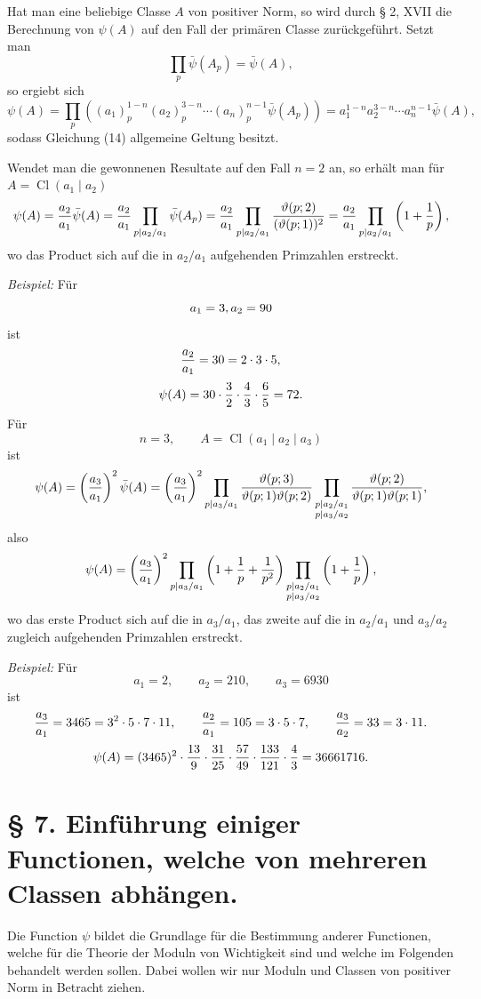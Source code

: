 \documentclass[11pt,a4paper]{article}
\newcommand{\Cl}{\operatorname{Cl}}
\newcommand{\tht}{\vartheta}
\begin{document}
Hat man eine beliebige Classe $A$ von positiver Norm, so wird durch § 2, XVII die Berechnung von $\psi(A)$ auf den Fall der primären Classe zurückgeführt. Setzt man
\[
 \prod_p\bar\psi(A_p)=\bar\psi(A),
\]
so ergiebt sich
\[
 \psi(A)=\prod_p\left((a_1)_p^{1-n}(a_2)_p^{3-n}\cdots(a_n)_p^{n-1}\bar\psi(A_p)\right)
 =a_1^{1-n}a_2^{3-n}\cdots a_n^{n-1}\bar\psi(A),
\]
sodass Gleichung (14) allgemeine Geltung besitzt.

Wendet man die gewonnenen Resultate auf den Fall $n=2$ an, so erhält man für $A=\Cl(a_1\mid a_2)$
\[
 \psi(A)={a_2\over a_1}\bar\psi(A)
 ={a_2\over a_1}\prod_{p\mid a_2/a_1}\bar\psi(A_p)
 ={a_2\over a_1}\prod_{p\mid a_2/a_1}{\tht(p;2)\over(\tht(p;1))^2}
 ={a_2\over a_1}\prod_{p\mid a_2/a_1}\left(1+{1\over p}\right),
\]
wo das Product sich auf die in $a_2/a_1$ aufgehenden Primzahlen erstreckt.

\emph{Beispiel:} Für
\[
 a_1=3,\\ a_2=90
\]
ist
\[
 {a_2\over a_1}=30=2\cdot3\cdot5,
\]
\[
 \psi(A)=30\cdot {3\over2}\cdot {4\over3}\cdot {6\over5}=72.
\]
Für
\[
 n=3,
 \qquad A=\Cl(a_1\mid a_2\mid a_3)
\]
ist
\[
 \psi(A)=\left({a_3\over a_1}\right)^2\bar\psi(A)
 =\left({a_3\over a_1}\right)^2
 \prod_{p\mid a_3/a_1}{\tht(p;3)\over\tht(p;1)\tht(p;2)}
 \prod_{\substack{p\mid a_2/a_1\\ p\mid a_3/a_2}}
 {\tht(p;2)\over\tht(p;1)\tht(p;1)},
\]
also
\[
 \psi(A)=\left({a_3\over a_1}\right)^2
 \prod_{p\mid a_3/a_1}\left(1+{1\over p}+{1\over p^2}\right)
 \prod_{\substack{p\mid a_2/a_1\\ p\mid a_3/a_2}}
 \left(1+{1\over p}\right),
\]
wo das erste Product sich auf die in $a_3/a_1$, das zweite auf die in $a_2/a_1$ und $a_3/a_2$ zugleich aufgehenden Primzahlen erstreckt.

\emph{Beispiel:} Für
\[
 a_1=2,\qquad a_2=210,\qquad a_3=6930
\]
ist
\[
 {a_3\over a_1}=3465=3^2\cdot5\cdot7\cdot11,
 \qquad {a_2\over a_1}=105=3\cdot5\cdot7,
 \qquad {a_3\over a_2}=33=3\cdot11.
\]
\[
 \psi(A)=(3465)^2\cdot {13\over9}\cdot {31\over25}\cdot {57\over49}\cdot {133\over121}\cdot {4\over3}=36661716.
\]

\section*{§ 7. Einführung einiger Functionen, welche von mehreren Classen abhängen.}

Die Function $\psi$ bildet die Grundlage für die Bestimmung anderer Functionen, welche für die Theorie der Moduln von Wichtigkeit sind und welche im Folgenden behandelt werden sollen. Dabei wollen wir nur Moduln und Classen von positiver Norm in Betracht ziehen.
\end{document}
